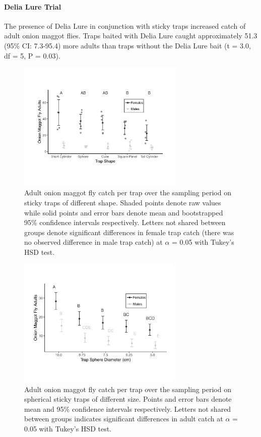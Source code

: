 \documentclass[alpha-refs]{wiley-article}
\begin{document}
\paragraph{Delia Lure Trial} The presence of Delia Lure in conjunction with sticky traps increased catch of adult onion maggot flies.  Traps baited with Delia Lure caught approximately 51.3 (95\% CI: 7.3-95.4) more adults than traps without the Delia Lure bait (t = 3.0, df = 5, P = 0.03).




\begin{figure}[bt]
\centering
\includegraphics[width = 8cm]{figures/publication/figure-1.pdf}
\caption{Adult onion maggot fly catch per trap over the sampling period on sticky traps of different shape.  Shaded points denote raw values while solid points and error bars denote mean and bootstrapped 95\% confidence intervals respectively.  Letters not shared between groups denote significant differences in female trap catch (there was no observed difference in male trap catch) at $\alpha$ = 0.05 with Tukey's HSD test. }
\label{fig:figure1}
\end{figure}

\begin{figure}[bt]
\centering
\includegraphics[width = 8cm]{figures/publication/figure-2.pdf}
\caption{Adult onion maggot fly catch per trap over the sampling period on spherical sticky traps of different size.  Points and error bars denote mean and 95\% confidence intervals respectively.  Letters not shared between groups indicates significant differences in adult catch at $\alpha$ = 0.05 with Tukey's HSD test.}
\label{fig:figure2}
\end{figure}
\end{document}
